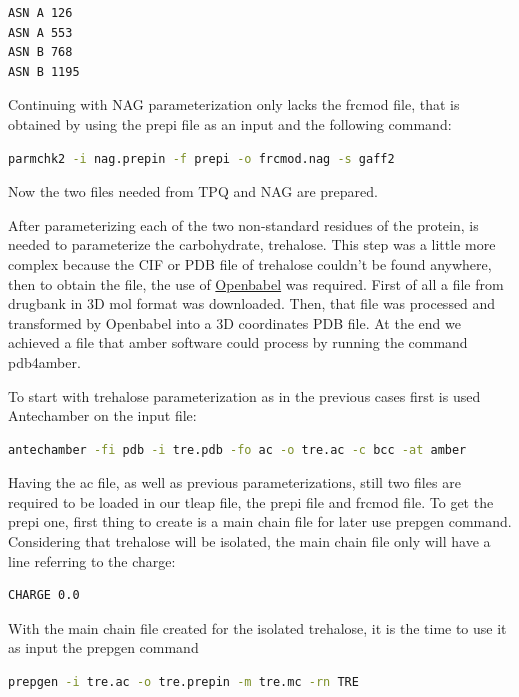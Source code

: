 \documentclass[a4paper]{article}
\begin{document}
\begin{verbatim}
ASN A 126
ASN A 553
ASN B 768
ASN B 1195
\end{verbatim}

Continuing with NAG parameterization only lacks the frcmod file, that is obtained by using the prepi file as an input and the following command:

\begin{lstlisting}[language=Bash,caption={Parmchk2 command}]
    parmchk2 -i nag.prepin -f prepi -o frcmod.nag -s gaff2
\end{lstlisting}

Now the two files needed from TPQ and NAG are prepared.

After parameterizing each of the two non-standard residues of the protein, is needed to parameterize the carbohydrate, trehalose. This step was a little more complex because the CIF or PDB file of trehalose couldn't be found anywhere, then to obtain the file, the use of \href{https://www.cheminfo.org/Chemistry/Cheminformatics/FormatConverter/index.html}{Openbabel} was required.
First of all a file from drugbank in 3D mol format was downloaded. Then, that file was processed and transformed by Openbabel into a 3D coordinates PDB file. At the end we achieved a file that amber software could process by running the command pdb4amber.

To start with trehalose parameterization as in the previous cases first is used Antechamber on the input file:

\begin{lstlisting}[language=Bash,caption={Antechamber for trehalose}]
    antechamber -fi pdb -i tre.pdb -fo ac -o tre.ac -c bcc -at amber
\end{lstlisting}

Having the ac file, as well as previous parameterizations, still two files are required to be loaded in our tleap file, the prepi file and frcmod file. To get the prepi one, first thing to create is a main chain file for later use prepgen command. Considering that trehalose will be isolated, the main chain file only will have a line referring to the charge:

\begin{verbatim}
CHARGE 0.0
\end{verbatim}

With the main chain file created for the isolated trehalose, it is the time to use it as input the prepgen command

\begin{lstlisting}[language=Bash,caption={Trehalose prepgen}]
   prepgen -i tre.ac -o tre.prepin -m tre.mc -rn TRE
\end{lstlisting}
\end{document}
